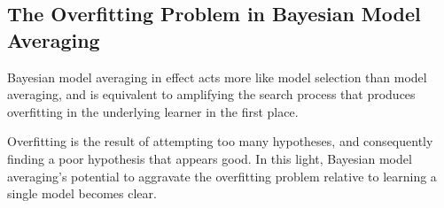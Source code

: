 \documentclass{article}
\begin{document}











\subsection{The Overfitting Problem in Bayesian Model Averaging}

Bayesian model averaging in effect acts more like model selection than model averaging, and is equivalent to amplifying the search process that produces overﬁtting in the underlying learner in the first place.

Overfitting is the result of attempting too many hypotheses, and consequently ﬁnding a poor hypothesis that appears good. In this light, Bayesian model averaging’s potential to aggravate the overﬁtting problem relative to learning a single model becomes clear.
\end{document}
